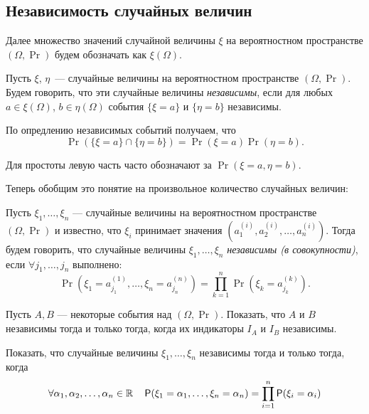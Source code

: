 \subsection{Независимость случайных величин}
Далее множество значений случайной величины \(\xi\) на вероятностном пространстве \((\Omega, \Pr)\) будем обозначать как \(\xi(\Omega)\).

\begin{definition}
    Пусть \(\xi\), \(\eta\)~--- случайные величины на вероятностном пространстве \((\Omega, \Pr)\). Будем говорить, что эти случайные величины \emph{независимы}, если для любых \(a \in \xi(\Omega)\), \(b \in \eta(\Omega)\) события \(\{\xi = a\}\) и \(\{\eta = b\}\) независимы.
\end{definition}
По опредлению независимых событий получаем, что
\[\Pr(\{\xi = a\} \cap \{\eta = b\}) = \Pr(\xi = a)\Pr(\eta = b).\]
\begin{remark}
    Для простоты левую часть часто обозначают за \(\Pr(\xi = a, \eta = b)\).
\end{remark}
Теперь обобщим это понятие на произвольное количество случайных величин:
\begin{definition}
    Пусть \(\xi_1, \ldots, \xi_n\) --- случайные величины на вероятностном пространстве \((\Omega, \Pr)\) и известно, что \(\xi_i\) принимает значения \((a_1^{(i)}, a_2^{(i)}, \ldots, a_n^{(i)})\). Тогда будем говорить, что случайные величины \(\xi_1, \ldots, \xi_n\) \emph{независимы (в совокупности)}, если \(\forall j_1, \ldots, j_n\) выполнено:
    \[\Pr(\xi_1 = a_{j_1}^{(1)}, \ldots, \xi_n = a_{j_n}^{(n)}) = \prod\limits_{k = 1}^{n}\Pr(\xi_k = a_{j_{k}}^{(k)}).\]
\end{definition}
\begin{exercise}
    Пусть \(A, B\) --- некоторые события над \((\Omega, \Pr)\). Показать, что \(A\) и \(B\) независимы тогда и только тогда, когда их индикаторы \(I_A\) и \(I_B\) независимы.
\end{exercise}
\begin{exercise}
    Показать, что случайные величины \(\xi_1, \ldots, \xi_n\) независимы тогда и только тогда, когда
    \[\forall \alpha_1, \alpha_2, \ldots, \alpha_n \in \R \quad \Pr(\xi_1 = \alpha_1, \ldots, \xi_n = \alpha_n) = \prod\limits_{i = 1}^{n}\Pr(\xi_i = \alpha_i)\]
\end{exercise}

